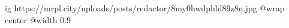  
 
 
 
 

\ifcmt
  ig https://mrpl.city/uploads/posts/redactor/8my0hwdphld89z8n.jpg
  @wrap center
  @width 0.9
\fi
